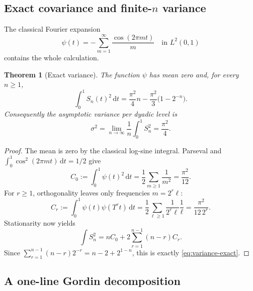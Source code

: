 \documentclass[11pt,oneside]{article}
\newtheorem{theorem}{Theorem}[section]
\theoremstyle{definition}
\theoremstyle{remark}
\newcommand{\dd}{\,\mathrm d}
\begin{document}
\subsection{Exact covariance and finite-\texorpdfstring{$n$}{n} variance}

The classical Fourier expansion
\begin{equation}
 \psi(t)=-\sum_{m=1}^{\infty}\frac{\cos(2\pi mt)}{m}
 \quad\text{in }L^2(0,1)
 \label{eq:clausen}
\end{equation}
contains the whole calculation.

\begin{theorem}[Exact variance]
\label{thm:exact-variance}
The function $\psi$ has mean zero and, for every $n\ge1$,
\begin{equation}
 \int_0^1 S_n(t)^2\dd t
 =\frac{\pi^2}{4}n-\frac{\pi^2}{3}\bigl(1-2^{-n}\bigr).
 \label{eq:variance-exact}
\end{equation}
Consequently the asymptotic variance per dyadic level is
\begin{equation}
 \sigma^2=\lim_{n\to\infty}\frac1n\int_0^1S_n^2=\frac{\pi^2}{4}.
 \label{eq:sigma}
\end{equation}
\end{theorem}

\begin{proof}
The mean is zero by the classical log-sine integral.  Parseval and
$\int_0^1\cos^2(2\pi mt)\dd t=1/2$ give
\[
 C_0:=\int_0^1\psi(t)^2\dd t
 =\frac12\sum_{m\ge1}\frac1{m^2}=\frac{\pi^2}{12}.
\]
For $r\ge1$, orthogonality leaves only frequencies $m=2^r\ell$:
\[
 C_r:=\int_0^1\psi(t)\psi(T^rt)\dd t
 =\frac12\sum_{\ell\ge1}\frac1{2^r\ell}\frac1\ell
 =\frac{\pi^2}{12\,2^r}.
\]
Stationarity now yields
\[
 \int S_n^2=nC_0+2\sum_{r=1}^{n-1}(n-r)C_r.
\]
Since $\sum_{r=1}^{n-1}(n-r)2^{-r}=n-2+2^{1-n}$, this is exactly
\eqref{eq:variance-exact}.
\end{proof}

\subsection{A one-line Gordin decomposition}
\end{document}
